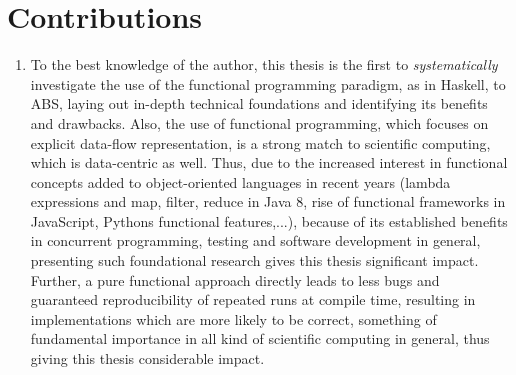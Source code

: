 
\section{Contributions}
\begin{enumerate}
	\item To the best knowledge of the author, this thesis is the first to \textit{systematically} investigate the use of the functional programming paradigm, as in Haskell, to ABS, laying out in-depth technical foundations and identifying its benefits and drawbacks. Also, the use of functional programming, which focuses on explicit data-flow representation, is a strong match to scientific computing, which is data-centric as well. Thus, due to the increased interest in functional concepts added to object-oriented languages in recent years (lambda expressions and map, filter, reduce in Java 8, rise of functional frameworks in JavaScript, Pythons functional features,...), because of its established benefits in concurrent programming, testing and software development in general, presenting such foundational research gives this thesis significant impact. Further, a pure functional approach directly leads to less bugs and guaranteed reproducibility of repeated runs at compile time, resulting in implementations which are more likely to be correct, something of fundamental importance in all kind of scientific computing in general, thus giving this thesis considerable impact.
	

\end{enumerate}
